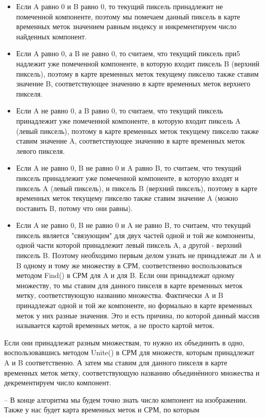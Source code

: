 \documentclass{report}
\begin{document}
\begin{itemize}
\item Если A равно 0 и B равно 0, то текущий пиксель принадлежит не помеченной компоненте, поэтому мы помечаем данный пиксель в карте
временных меток значением равным индексу и инкрементируем число найденных компонент.
\item Если A равно 0, а B не равно 0, то считаем, что текущий пиксель при5
надлежит уже помеченной компоненте, в которую входит пиксель B
(верхний пиксель), поэтому в карте временных меток текущему пикселю также ставим значение B, соответствующее значению в карте
временных меток верхнего пикселя.
\item Если A не равно 0, а B равно 0, то считаем, что текущий пиксель принадлежит уже помеченной компоненте, в которую входит пиксель A
(левый пиксель), поэтому в карте временных меток текущему пикселю также ставим значение A, соответствующее значению в карте
временных меток левого пикселя.
\item Если A не равно 0, B не равно 0 и A равно B, то считаем, что текущий
пиксель принадлежит уже помеченной компоненте, в которую входят
и пиксель A (левый пиксель), и пиксель B (верхний пиксель), поэтому
в карте временных меток текущему пикселю также ставим значение
A (можно поставить B, потому что они равны).
\item Если A не равно 0, B не равно 0 и A не равно B, то считаем, что
текущий пиксель является "связующим" для двух частей одной и той
же компоненты, одной части которой принадлежит левый пиксель
A, а другой - верхний пиксель B. Поэтому необходимо первым делом
узнать не принадлежат ли A и B одному и тому же множеству в
СРМ, соответственно воспользоваться методом Find() в СРМ для A
и для B.
Если они принадлежат одному множеству, то мы ставим для данного
пикселя в карте временных меток метку, соответствующую названию
множества. Фактически A и B принадлежат одной и той же компоненте, но формально в карте временных меток у них разные значения. Это и есть причина, по которой данный массив называется
картой временных меток, а не просто картой меток.
\end{itemize}
\par Если они принадлежат разным множествам, то нужно их объединить
в одно, воспользовавшись методом Unite() в СРМ для множеств, которым принадлежат A и B соответственно. А затем мы ставим для
данного пикселя в карте временных меток метку, соответствующую
названию объединённого множества и декрементируем число компонент.
\par – В конце алгоритма мы будем точно знать число компонент на изображении. Также у нас будет карта временных меток и СРМ, по которым
\end{document}
